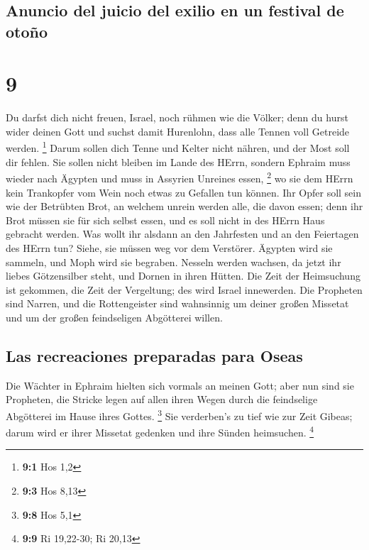 \hypertarget{anuncio-del-juicio-del-exilio-en-un-festival-de-otouxf1o}{%
\subsection{Anuncio del juicio del exilio en un festival de
otoño}\label{anuncio-del-juicio-del-exilio-en-un-festival-de-otouxf1o}}

\hypertarget{section-8}{%
\section{9}\label{section-8}}

 Du darfst dich nicht freuen, Israel, noch rühmen wie die
Völker; denn du hurst wider deinen Gott und suchst damit Hurenlohn, dass
alle Tennen voll Getreide werden. \footnote{\textbf{9:1} Hos 1,2}
 Darum sollen dich Tenne und Kelter nicht nähren, und der
Most soll dir fehlen.  Sie sollen nicht bleiben im Lande
des HErrn, sondern Ephraim muss wieder nach Ägypten und muss in Assyrien
Unreines essen, \footnote{\textbf{9:3} Hos 8,13}  wo sie
dem HErrn kein Trankopfer vom Wein noch etwas zu Gefallen tun können.
Ihr Opfer soll sein wie der Betrübten Brot, an welchem unrein werden
alle, die davon essen; denn ihr Brot müssen sie für sich selbst essen,
und es soll nicht in des HErrn Haus gebracht werden.  Was
wollt ihr alsdann an den Jahrfesten und an den Feiertagen des HErrn tun?
 Siehe, sie müssen weg vor dem Verstörer. Ägypten wird sie
sammeln, und Moph wird sie begraben. Nesseln werden wachsen, da jetzt
ihr liebes Götzensilber steht, und Dornen in ihren Hütten.
 Die Zeit der Heimsuchung ist gekommen, die Zeit der
Vergeltung; des wird Israel innewerden. Die Propheten sind Narren, und
die Rottengeister sind wahnsinnig um deiner großen Missetat und um der
großen feindseligen Abgötterei willen.

\hypertarget{las-recreaciones-preparadas-para-oseas}{%
\subsection{Las recreaciones preparadas para
Oseas}\label{las-recreaciones-preparadas-para-oseas}}

 Die Wächter in Ephraim hielten sich vormals an meinen
Gott; aber nun sind sie Propheten, die Stricke legen auf allen ihren
Wegen durch die feindselige Abgötterei im Hause ihres Gottes.
\footnote{\textbf{9:8} Hos 5,1}  Sie verderben's zu tief
wie zur Zeit Gibeas; darum wird er ihrer Missetat gedenken und ihre
Sünden heimsuchen. \footnote{\textbf{9:9} Ri 19,22-30; Ri 20,13}

